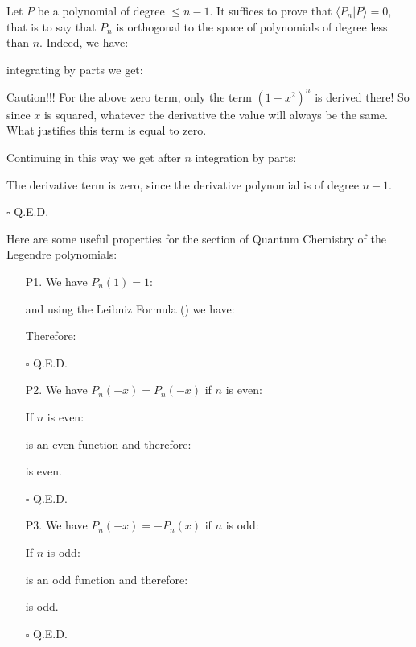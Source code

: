 	\begin{dem}
	Let $P$ be a polynomial of degree $\leq n-1$. It suffices to prove that $\langle P_n | P \rangle =0$, that is to say that $P_n$ is orthogonal to the space of polynomials of degree less than $n$. Indeed, we have:
	
	integrating by parts we get:
	
	Caution!!! For the above zero term, only the term $(1-x^2)^n$ is derived there! So since $x$ is squared, whatever the derivative the value will always be the same. What justifies this term is equal to zero.
	
	Continuing in this way we get after $n$ integration by parts:
	
	\begin{tcolorbox}[title=Remark,colframe=black,arc=10pt]
	The derivative term is zero, since the derivative polynomial is of degree $n-1$.
	\end{tcolorbox}
	\begin{flushright}
		$\square$  Q.E.D.
	\end{flushright}
	\end{dem}	
	Here are some useful properties for the section of Quantum Chemistry of the Legendre polynomials:
	\begin{enumerate}
		\item[P1.] We have $P_n(1)=1$:
		\begin{dem}
		
		and using the Leibniz Formula () we have:
		
		Therefore:
		
		\begin{flushright}
			$\square$  Q.E.D.
		\end{flushright}
		\end{dem}

		\item[P2.] We have $P_n(-x)=P_n(-x)$ if $n$ is even:
		\begin{dem}
		If $n$ is even:
		
		is an even function and therefore:
		
		is even.
		\begin{flushright}
			$\square$  Q.E.D.
		\end{flushright}
		\end{dem}

		\item[P3.] We have $P_n(-x)=-P_n(x)$ if $n$ is odd:
		\begin{dem}
		If $n$ is odd:
		
		is an odd function and therefore:
		
		is odd.
		\begin{flushright}
			$\square$  Q.E.D.
		\end{flushright}
		\end{dem}
	\end{enumerate}
